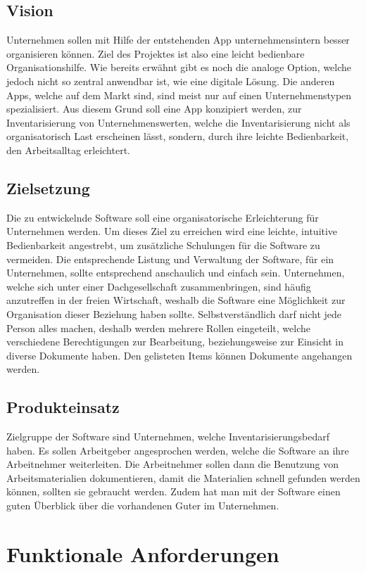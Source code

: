 \documentclass[11pt,a4paper]{report}
\begin{document}
\subsection{Vision}
Unternehmen sollen mit Hilfe der entstehenden App unternehmensintern besser organisieren können.
Ziel des Projektes ist also eine leicht bedienbare Organisationshilfe.
Wie bereits erwähnt gibt es noch die analoge Option, welche jedoch nicht so zentral anwendbar ist, wie eine digitale Lösung.
Die anderen Apps, welche auf dem Markt sind, sind meist nur auf einen Unternehmenstypen spezialisiert.
Aus diesem Grund soll eine App konzipiert werden, zur Inventarisierung von Unternehmenswerten, welche die Inventarisierung nicht als organisatorisch Last erscheinen lässt, sondern, durch ihre leichte Bedienbarkeit, den Arbeitsalltag erleichtert.
\subsection{Zielsetzung}
Die zu entwickelnde Software soll eine organisatorische Erleichterung für Unternehmen werden.
Um dieses Ziel zu erreichen wird eine leichte, intuitive Bedienbarkeit angestrebt, um zusätzliche Schulungen für die Software zu vermeiden.
Die entsprechende Listung und Verwaltung der Software, für ein Unternehmen, sollte entsprechend anschaulich und einfach sein.
Unternehmen, welche sich unter einer Dachgesellschaft zusammenbringen, sind häufig anzutreffen in der freien Wirtschaft, weshalb die Software eine Möglichkeit zur Organisation dieser Beziehung haben sollte.
Selbstverständlich darf nicht jede Person alles machen, deshalb werden mehrere Rollen eingeteilt, welche verschiedene Berechtigungen zur Bearbeitung, beziehungsweise zur Einsicht in diverse Dokumente haben.
Den gelisteten Items können Dokumente angehangen werden.
\subsection{Produkteinsatz}
Zielgruppe der Software sind Unternehmen, welche Inventarisierungsbedarf haben.
Es sollen Arbeitgeber angesprochen werden, welche die Software an ihre Arbeitnehmer weiterleiten.
Die Arbeitnehmer sollen dann die Benutzung von Arbeitsmaterialien dokumentieren, damit die Materialien schnell gefunden werden können, sollten sie gebraucht werden.
Zudem hat man mit der Software einen guten Überblick über die vorhandenen Guter im Unternehmen.
\newpage

\section{Funktionale Anforderungen}
\end{document}
